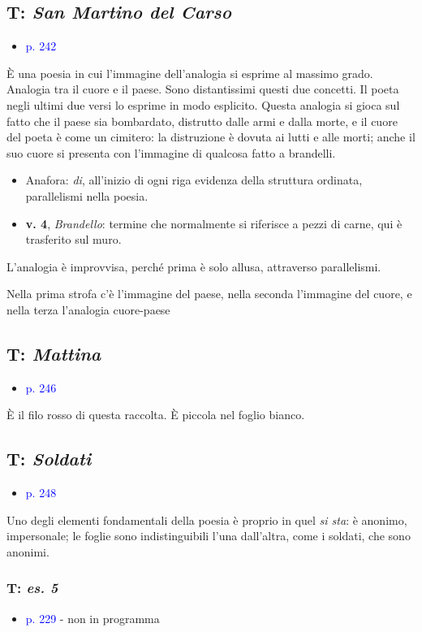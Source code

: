 \documentclass[a4paper, twoside, titlepage]{book}
\newcommand{\elenco}[1]{%
\begin{itemize}
#1
\end{itemize}}
\renewcommand{\emph}[1]{\textcolor{blue}{#1}}
\begin{document}
\subsection{T: \textit{San Martino del Carso}}
\elenco{\item \emph{p. 242}}

È una poesia in cui l'immagine dell'analogia si esprime al massimo grado. Analogia tra il cuore e il paese. Sono distantissimi questi due concetti. Il poeta negli ultimi due versi lo esprime in modo esplicito.
Questa analogia si gioca sul fatto che il paese sia bombardato, distrutto dalle armi e dalla morte, e il cuore del poeta è come un cimitero: la distruzione è dovuta ai lutti e alle morti; anche il suo cuore si presenta con l'immagine di qualcosa fatto a brandelli.

\elenco{\item Anafora: \textit{di}, all'inizio di ogni riga evidenza della struttura ordinata, parallelismi nella poesia.\item \textbf{v. 4}, \textit{Brandello}: termine che normalmente si riferisce a pezzi di carne, qui è trasferito sul muro.}

L’analogia è improvvisa, perché prima è solo allusa, attraverso parallelismi.

Nella prima strofa c'è l'immagine del paese, nella seconda l'immagine del cuore, e nella terza l'analogia cuore-paese

\subsection{T: \textit{Mattina}}\elenco{\item \emph{p. 246}}

È il filo rosso di questa raccolta. È piccola nel foglio bianco.

\subsection{T: \textit{Soldati}}\elenco{\item \emph{p. 248}}

Uno degli elementi fondamentali della poesia è proprio in quel \textit{si sta}: è anonimo, impersonale; le foglie sono indistinguibili l'una dall'altra, come i soldati, che sono anonimi.

\subsubsection{T: \textit{es. 5}}
\elenco{\item \emph{p. 229} - non in programma}
\end{document}
